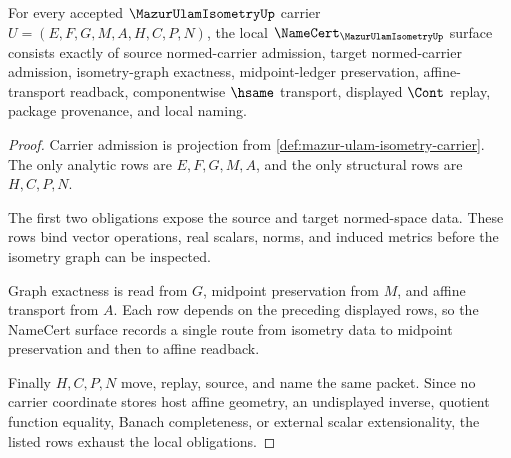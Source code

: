 \begin{theorem}
\label{thm:mazur-ulam-namecert-obligations}
For every accepted $\MazurUlamIsometryUp$ carrier $U=(E,F,G,M,A,H,C,P,N)$, the local $\NameCert_{\MazurUlamIsometryUp}$ surface consists exactly of source normed-carrier admission, target normed-carrier admission, isometry-graph exactness, midpoint-ledger preservation, affine-transport readback, componentwise $\hsame$ transport, displayed $\Cont$ replay, package provenance, and local naming.
\end{theorem}
\begin{proof}
Carrier admission is projection from \autoref{def:mazur-ulam-isometry-carrier}. The only analytic rows are $E,F,G,M,A$, and the only structural rows are $H,C,P,N$.

The first two obligations expose the source and target normed-space data. These rows bind vector operations, real scalars, norms, and induced metrics before the isometry graph can be inspected.

Graph exactness is read from $G$, midpoint preservation from $M$, and affine transport from $A$. Each row depends on the preceding displayed rows, so the NameCert surface records a single route from isometry data to midpoint preservation and then to affine readback.

Finally $H,C,P,N$ move, replay, source, and name the same packet. Since no carrier coordinate stores host affine geometry, an undisplayed inverse, quotient function equality, Banach completeness, or external scalar extensionality, the listed rows exhaust the local obligations.
\end{proof}

\begin{closurestatus}{\MazurUlamIsometryUp}
  \theoryclosure{\seedClosure}
  \formalstatus{\unformalizedV}
\end{closurestatus}
